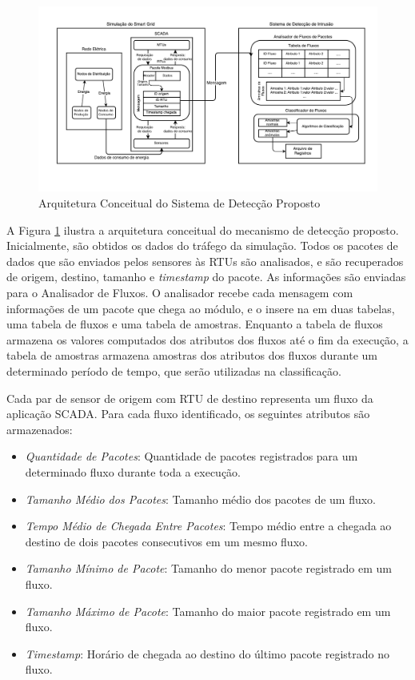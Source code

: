 \documentclass[12pt]{article}
\begin{document}
\begin{figure}[h]
   \caption{Arquitetura Conceitual do Sistema de Detecção Proposto}
   \begin{center}
       \includegraphics[width=38em]{sdi_diagram}
   \end{center}
   \label{sdi_diagram}
\end{figure}

A Figura \ref{sdi_diagram} ilustra a arquitetura conceitual do mecanismo de detecção proposto. Inicialmente, são obtidos os dados do tráfego da simulação. Todos os pacotes de dados que são enviados pelos sensores às RTUs são analisados, e são recuperados de origem, destino, tamanho e \emph{timestamp} do pacote. As informações são enviadas para o Analisador de Fluxos. O analisador recebe cada mensagem com informações de um pacote que chega ao módulo, e o insere na em duas tabelas, uma tabela de fluxos e uma tabela de amostras. Enquanto a tabela de fluxos armazena os valores computados dos atributos dos fluxos até o fim da execução, a tabela de amostras armazena amostras dos atributos dos fluxos durante um determinado período de tempo, que serão utilizadas na classificação.

Cada par de sensor de origem com RTU de destino representa um fluxo da aplicação SCADA. Para cada fluxo identificado, os seguintes atributos são armazenados:
\begin{itemize}
\item{\emph{Quantidade de Pacotes}}: Quantidade de pacotes registrados para um determinado fluxo durante toda a execução.
\item{\emph{Tamanho Médio dos Pacotes}}: Tamanho médio dos pacotes de um fluxo.  
\item{\emph{Tempo Médio de Chegada Entre Pacotes}}: Tempo médio entre a chegada ao destino de dois pacotes consecutivos em um mesmo fluxo.
\item{\emph{Tamanho Mínimo de Pacote}}: Tamanho do menor pacote registrado em um fluxo.
\item{\emph{Tamanho Máximo de Pacote}}: Tamanho do maior pacote registrado em um fluxo.
\item{\emph{Timestamp}}: Horário de chegada ao destino do último pacote registrado no fluxo.
\end{itemize}
\end{document}
